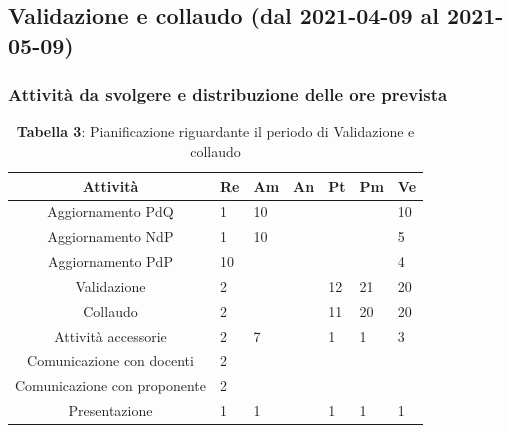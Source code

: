 \subsection{Validazione e collaudo (dal 2021-04-09 al 2021-05-09)}


\subsubsection{Attività da svolgere e distribuzione delle ore prevista}
\begin{table}[H]
	\centering
	\renewcommand{\arraystretch}{1.5}
	\begin{tabular}{|c|p{10mm}|p{10mm}|p{10mm}|p{10mm}|p{10mm}|p{10mm}|}
		\hline
		\rowcolor{lighter-grayer}
		Attività & Re & Am & An & Pt & Pm & Ve \\ \hline
		Aggiornamento PdQ          & 1  & 10 &  &    &    & 10 \\ \hline
		Aggiornamento NdP          & 1  & 10 &  &    &    & 5  \\ \hline
		Aggiornamento PdP          & 10 &    &  &    &    & 4  \\ \hline
		Validazione                & 2  &    &  & 12 & 21 & 20 \\ \hline
		Collaudo                   & 2  &    &  & 11 & 20 & 20 \\ \hline
		Attività accessorie 	   & 2  & 7  &  & 1  & 1  & 3  \\ \hline
		Comunicazione con docenti  & 2  &    &  &    &    &    \\ \hline
		Comunicazione con proponente& 2  &    &  &    &    &    \\ \hline
		Presentazione              & 1  & 1  &  & 1  & 1  & 1 \\
		\hline
	\end{tabular}
	\caption*{\textbf{Tabella 3}: Pianificazione riguardante il periodo di Validazione e collaudo\\}
\end{table}